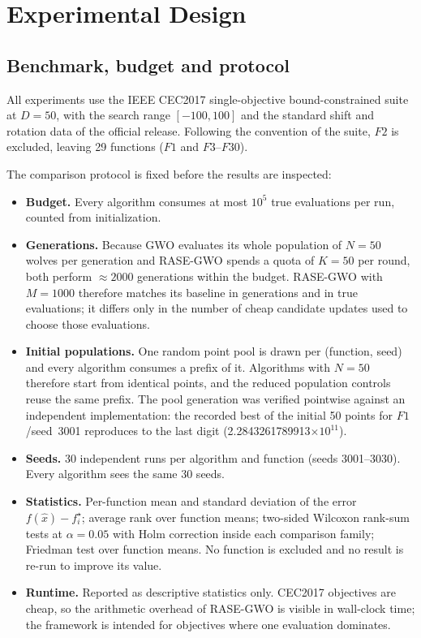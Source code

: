 \section{Experimental Design}
\label{sec:exp}

\subsection{Benchmark, budget and protocol}

All experiments use the IEEE CEC2017 single-objective bound-constrained suite
at $D=50$, with the search range $[-100,100]$ and the standard shift and
rotation data of the official release. Following the convention of the suite,
$F2$ is excluded, leaving 29 functions ($F1$ and $F3$--$F30$).

The comparison protocol is fixed before the results are inspected:

\begin{itemize}
  \item \textbf{Budget.} Every algorithm consumes at most
        $10^{5}$ true evaluations per run, counted from initialization.
  \item \textbf{Generations.} Because GWO evaluates its whole population of
        $N=50$ wolves per generation and RASE-GWO spends a quota of
        $K=50$ per round, both perform $\approx 2000$ generations within the
        budget. RASE-GWO with $M=1000$ therefore matches its baseline in
        generations and in true evaluations; it differs only in the number of
        cheap candidate updates used to choose those evaluations.
  \item \textbf{Initial populations.} One random point pool is drawn per
        (function, seed) and every algorithm consumes a prefix of it. Algorithms
        with $N=50$ therefore start from identical points, and the reduced
        population controls reuse the same prefix. The pool generation was
        verified pointwise against an independent implementation: the recorded
        best of the initial 50 points for $F1$/seed~3001 reproduces to the last
        digit (2.2843261789913$\times 10^{11}$).
  \item \textbf{Seeds.} 30 independent runs per algorithm and function
        (seeds 3001--3030). Every algorithm sees the same 30 seeds.
  \item \textbf{Statistics.} Per-function mean and standard deviation of the
        error $f(\hat{x}) - f_i^\star$; average rank over function means;
        two-sided Wilcoxon rank-sum tests at $\alpha=0.05$ with Holm correction
        inside each comparison family; Friedman test over function means.
        No function is excluded and no result is re-run to improve its value.
  \item \textbf{Runtime.} Reported as descriptive statistics only. CEC2017
        objectives are cheap, so the arithmetic overhead of RASE-GWO is visible
        in wall-clock time; the framework is intended for objectives where one
        evaluation dominates.
\end{itemize}

